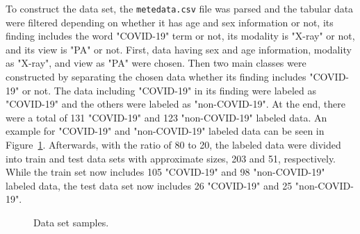 To construct the data set, the \texttt{metedata.csv} file was parsed and the tabular data were filtered depending on whether it has age and sex information or not, its finding includes the word "COVID-19" term or not, its modality is "X-ray" or not, and its view is "PA" or not. First, data having sex and age information, modality as "X-ray", and view as "PA" were chosen. Then two main classes were constructed by separating the chosen data whether its finding includes "COVID-19" or not. The data including "COVID-19" in its finding were labeled as "COVID-19" and the others were labeled as "non-COVID-19". At the end, there were a total of 131 "COVID-19" and 123 "non-COVID-19" labeled data. An example for "COVID-19" and "non-COVID-19" labeled data can be seen in Figure~\ref{fig:dataset_samples}. Afterwards, with the ratio of 80 to 20, the labeled data were divided into train and test data sets with approximate sizes, 203 and 51, respectively. While the train set now includes 105 "COVID-19" and 98 "non-COVID-19" labeled data, the test data set now includes 26 "COVID-19" and 25 "non-COVID-19".



\begin{figure}[h]
	\centering
	\caption{Data set samples.}
	\label{fig:dataset_samples}
\end{figure}

